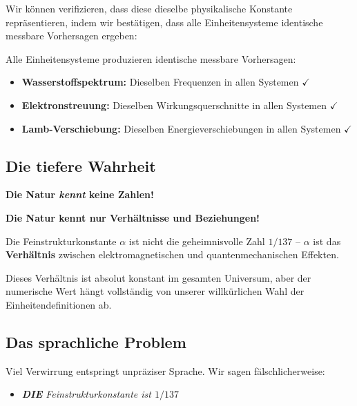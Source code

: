 	Wir können verifizieren, dass diese dieselbe physikalische Konstante repräsentieren, indem wir bestätigen, dass alle Einheitensysteme identische messbare Vorhersagen ergeben:
	
	\begin{theorem}
		Alle Einheitensysteme produzieren identische messbare Vorhersagen:
		\begin{itemize}
			\item \textbf{Wasserstoffspektrum:} Dieselben Frequenzen in allen Systemen $\checkmark$
			\item \textbf{Elektronstreuung:} Dieselben Wirkungsquerschnitte in allen Systemen $\checkmark$
			\item \textbf{Lamb-Verschiebung:} Dieselben Energieverschiebungen in allen Systemen $\checkmark$
		\end{itemize}
	\end{theorem}
	
	\subsection{Die tiefere Wahrheit}
	
	\begin{tcolorbox}[colback=green!5!white,colframe=green!75!black,title=Naturs wahre Sprache]
		\textbf{Die Natur \textit{kennt} keine Zahlen!}
		
		\textbf{Die Natur kennt nur Verhältnisse und Beziehungen!}
	\end{tcolorbox}
	
	Die Feinstrukturkonstante $\alpha$ ist nicht die geheimnisvolle Zahl \textit{$1/137$} -- $\alpha$ ist das \textbf{Verhältnis} zwischen elektromagnetischen und quantenmechanischen Effekten.
	
	Dieses Verhältnis ist absolut konstant im gesamten Universum, aber der numerische Wert hängt vollständig von unserer willkürlichen Wahl der Einheitendefinitionen ab.
	
	\subsection{Das sprachliche Problem}
	
	Viel Verwirrung entspringt unpräziser Sprache. Wir sagen fälschlicherweise:
	\begin{itemize}
		\item[\textcolor{red}{$\times$}] \textit{\textbf{DIE} Feinstrukturkonstante ist $1/137$}
	\end{itemize}
	
